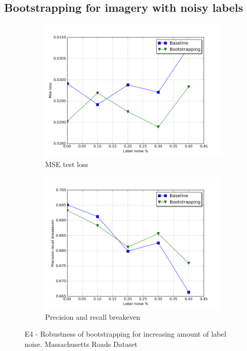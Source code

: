 \subsection{Bootstrapping for imagery with noisy labels}
\label{sec:results_bootstrapping}
\begin{figure}[!ht]
\begin{subfigure}{0.48\textwidth}
\includegraphics[width=\linewidth]{figs/E3/E3_lc_noise.png}
\caption{MSE test loss} \label{fig:E3_boot_mass_loss}
\end{subfigure}
\hspace*{\fill} %
\begin{subfigure}{0.48\textwidth}
\includegraphics[width=\linewidth]{figs/E3/E3_pr_noise.png}
\caption{Precision and recall breakeven} \label{fig:E3_boot_mass_pr}
\end{subfigure}
\hspace*{\fill} %
\caption{E4 - Robustness of bootstrapping for increasing amount of label noise. Massachusetts Roads Dataset} \label{fig:E3_boot_mass}
\end{figure}

